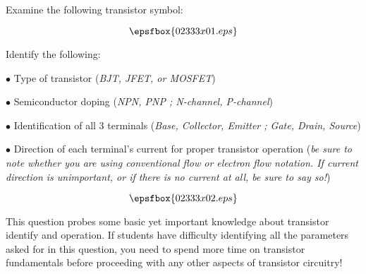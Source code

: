 

Examine the following transistor symbol:

$$\epsfbox{02333x01.eps}$$

\goodbreak

Identify the following:

\medskip
\item{$\bullet$} Type of transistor ({\it BJT, JFET, or MOSFET})
\item{$\bullet$} Semiconductor doping ({\it NPN, PNP ; N-channel, P-channel})
\item{$\bullet$} Identification of all 3 terminals ({\it Base, Collector, Emitter ; Gate, Drain, Source})
\item{$\bullet$} Direction of each terminal's current for proper transistor operation ({\it be sure to note whether you are using conventional flow or electron flow notation.  If current direction is unimportant, or if there is no current at all, be sure to say so!})
\medskip







$$\epsfbox{02333x02.eps}$$







This question probes some basic yet important knowledge about transistor identify and operation.  If students have difficulty identifying all the parameters asked for in this question, you need to spend more time on transistor fundamentals before proceeding with any other aspects of transistor circuitry!




